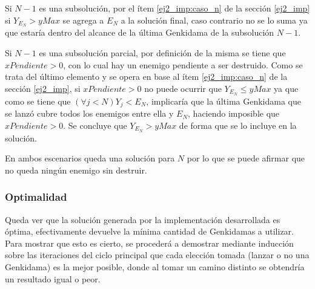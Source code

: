 \begin{enumerate}
{			Si $N - 1$ es una subsolución, por el ítem \ref{ej2_imp:caso_n} de
			la sección \ref{ej2_imp} si $Y_{E_N} > yMax$ se agrega a $E_N$ a la
			solución final, caso contrario no se lo suma ya que estaría dentro
			del alcance de la última Genkidama de la subsolución $N -1$.

			Si $N - 1$ es una subsolución parcial, por definición de la misma se
			tiene que $xPendiente > 0$, con lo cual hay un enemigo pendiente a
			ser destruido. Como se trata del último elemento y se opera en base
			al ítem \ref{ej2_imp:caso_n} de la sección \ref{ej2_imp},
			si $xPendiente > 0$ no puede ocurrir que $Y_{E_N} \leq yMax$ ya que
			como se tiene que $(\forall j < N) Y_j < E_N$, implicaría que la
			última Genkidama que se lanzó cubre todos los enemigos entre ella y
			$E_N$, haciendo imposible que $xPendiente > 0$. Se concluye que
			$Y_{E_N} > yMax$ de forma que se lo incluye en la solución.

			En ambos escenarios queda una solución para $N$ por lo que se puede
			afirmar que no queda ningún enemigo sin destruir.
		}
	\end{enumerate}

	\subsubsection*{Optimalidad}

	Queda ver que la solución generada por la implementación desarrollada es
	óptima, efectivamente devuelve la mínima cantidad de Genkidamas a utilizar.
	Para mostrar que esto es cierto, se procederá a demostrar mediante inducción
	sobre las iteraciones del ciclo principal que cada elección tomada (lanzar
	o no una Genkidama) es la mejor posible, donde al tomar un camino distinto
	se obtendría un resultado igual o peor.

